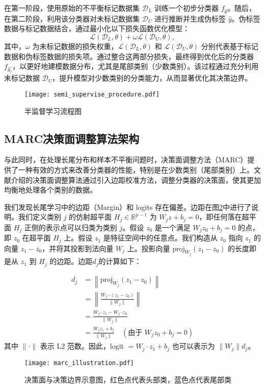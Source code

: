 \documentclass[master]{thesis-uestc}
\begin{document}
在第一阶段，使用原始的不平衡标记数据集 $\mathcal{D}_{L}$ 训练一个初步分类器 $f_{\hat{\theta}}$。随后，在第二阶段，利用该分类器对未标记数据集 $\mathcal{D}_{U}$ 进行推断并生成伪标签 $\hat{y}$。伪标签数据与标记数据结合，通过最小化以下损失函数优化模型：
\begin{equation} 
    \mathcal{L}(\mathcal{D}_{L},\theta) + \omega \mathcal{L}(\mathcal{D}_{U},\theta), 
\end{equation}
其中，$\omega$ 为未标记数据的损失权重，$\mathcal{L}(\mathcal{D}_{L},\theta)$ 和 $\mathcal{L}(\mathcal{D}_{U},\theta)$ 分别代表基于标记数据和伪标签数据的损失项。通过整合这两部分损失，最终得到优化后的分类器 $f_{\hat{\theta_f}}$，以更好地建模数据分布，尤其是尾部类别（少数类别）。该过程通过充分利用未标记数据 $\mathcal{D}_{U}$，提升模型对少数类别的分类能力，从而显著优化其决策边界。

\begin{figure}[h]
    \centering
    \texttt{[image: semi\_supervise\_procedure.pdf]}
    \caption{半监督学习流程图}
    \label{semi_supervise_procedure}
\end{figure}

\subsection{MARC决策面调整算法架构}
与此同时，在处理长尾分布和样本不平衡问题时，决策面调整方法（MARC）提供了一种有效的方式来改善分类器的性能，特别是在少数类别（尾部类别）上。文献\cite{wang2023margin}介绍的决策面调整算法通过引入边距校准方法，调整分类器的决策面，使其更加均衡地处理各个类别的数据。

我们发现长尾学习中的边距（Margin）和 logits 存在偏差。边距在图\ref{marc_illustration}中进行了说明。我们定义类别 $ j $ 的仿射超平面 $ H_j \in \mathbb{R}^{p-1} $ 为 $ W_j z + b_j = 0 $，即任何落在超平面 $ H_j $ 正侧的表示点可以归类为类别 $ j $。假设 $ z_0 $ 是一个满足 $ W_j z_0 + b_j = 0 $ 的点，即 $ z_0 $ 在超平面 $ H_j $ 上。假设 $ z_1 $ 是特征空间中的任意点。我们构造从 $ z_0 $ 指向 $ z_1 $ 的向量 $ z_1 - z_0 $，并将其投影到法向量 $ W_j $ 上。投影向量 $ \text{proj}_{W_j}(z_1 - z_0) $ 的长度即是从 $ z_1 $ 到 $ H_j $ 的边距。边距$d_j$的计算如下：

\begin{equation}
    \begin{split}
        d_j &= \left\| \text{proj}_{W_j}(z_1 - z_0) \right\| \\
            &= \left\| \frac{W_j \cdot (z_1 - z_0)}{\|W_j\|} \right\| \\
            &= \frac{W_j \cdot z_1 - W_j \cdot z_0}{\|W_j\|} \\
            &= \frac{W_j z_1 + b_j}{\|W_j\|} \quad (\text{由于 } W_j z_0 + b_j = 0)
    \end{split}
\end{equation}
其中 $ \| \cdot \| $ 表示 L2 范数。因此，logit $= W_j \cdot z_1 + b_j $ 也可以表示为 $ \|W_j\| d_j $。
\begin{figure}[h]
    \centering
    \texttt{[image: marc\_illustration.pdf]}
    \caption{决策面与决策边界示意图，红色点代表头部类，蓝色点代表尾部类}
    \label{marc_illustration}
\end{figure}
\end{document}
